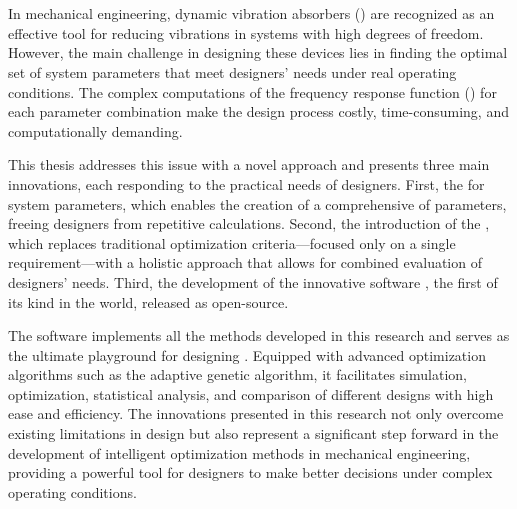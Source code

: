 \chapter*{\AbstractHeadTitle}\thispagestyle{empty}

In mechanical engineering, dynamic vibration absorbers () are recognized as an effective tool for reducing vibrations in systems with high degrees of freedom. However, the main challenge in designing these devices lies in finding the optimal set of system parameters that meet designers’ needs under real operating conditions. The complex computations of the frequency response function () for each parameter combination make the design process costly, time-consuming, and computationally demanding.

This thesis addresses this issue with a novel approach and presents three main innovations, each responding to the practical needs of designers. First, the  for system parameters, which enables the creation of a comprehensive  of  parameters, freeing designers from repetitive calculations. Second, the introduction of the , which replaces traditional optimization criteria—focused only on a single requirement—with a holistic approach that allows for combined evaluation of designers’ needs. Third, the development of the innovative software , the first of its kind in the world, released as open-source.

The  software implements all the methods developed in this research and serves as the ultimate playground for designing . Equipped with advanced optimization algorithms such as the adaptive genetic algorithm, it facilitates simulation, optimization, statistical analysis, and comparison of different designs with high ease and efficiency. The innovations presented in this research not only overcome existing limitations in  design but also represent a significant step forward in the development of intelligent optimization methods in mechanical engineering, providing a powerful tool for designers to make better decisions under complex operating conditions.
